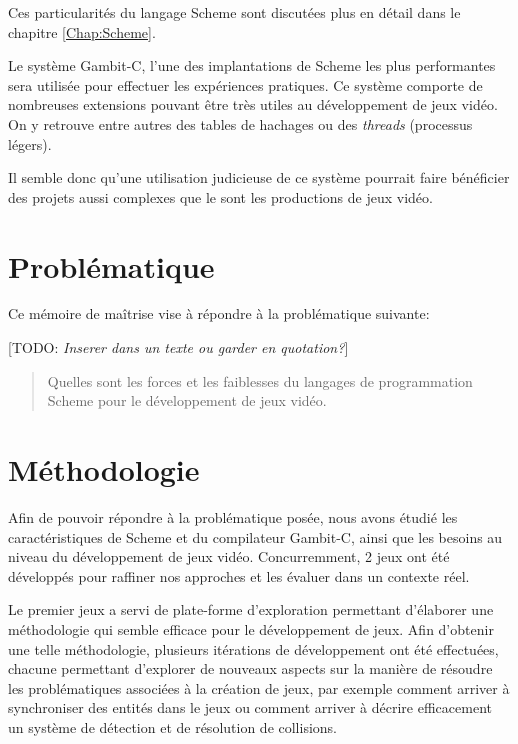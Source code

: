 \documentclass[12pt,oneside,letterpaper,francais]{book}
\newcommand{\todo}[1]{[TODO: {\it #1}]}
\begin{document}
Ces particularités du langage Scheme sont discutées plus en détail
dans le chapitre \ref{Chap:Scheme}.

Le système Gambit-C, l'une des implantations de Scheme les plus
performantes~\cite{GAMBIT_BENCHMARKS} sera utilisée pour effectuer les
expériences pratiques. Ce système comporte de nombreuses extensions
pouvant être très utiles au développement de jeux vidéo. On y retrouve
entre autres des tables de hachages ou des \textit{threads} (processus
légers).

Il semble donc qu'une utilisation judicieuse de ce système pourrait
faire bénéficier des projets aussi complexes que le sont les
productions de jeux vidéo.

\section{Problématique}
Ce mémoire de maîtrise vise à répondre à la problématique suivante:

\todo{Inserer dans un texte ou garder en quotation?}

\begin{quote}
  Quelles sont les forces et les faiblesses du langages de
  programmation Scheme pour le développement de jeux vidéo.
\end{quote}

\section{Méthodologie}



Afin de pouvoir répondre à la problématique posée, nous avons étudié
les caractéristiques de Scheme et du compilateur Gambit-C, ainsi que
les besoins au niveau du développement de jeux vidéo. Concurremment, 2
jeux ont été développés pour raffiner nos approches et les évaluer
dans un contexte réel.

Le premier jeux a servi de plate-forme d'exploration permettant
d'élaborer une méthodologie qui semble efficace pour le développement
de jeux. Afin d'obtenir une telle méthodologie, plusieurs itérations
de développement ont été effectuées, chacune permettant d'explorer de
nouveaux aspects sur la manière de résoudre les problématiques
associées à la création de jeux, par exemple comment arriver à
synchroniser des entités dans le jeux ou comment arriver à décrire
efficacement un système de détection et de résolution de collisions.
\end{document}

